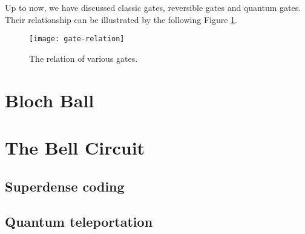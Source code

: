 \documentclass{easyclass}
\begin{document}
Up to now, we have discussed classic gates, reversible gates and quantum gates. Their relationship can be illustrated by the following Figure \ref{fig:gate-relation}.

\begin{figure}[h]
	\centering
	\texttt{[image: gate-relation]}
	\caption{The relation of various gates.}
	\label{fig:gate-relation}
\end{figure}

\section{Bloch Ball}
\section{The Bell Circuit}
\subsection{Superdense coding}
\subsection{Quantum teleportation}




\ifx\flag\undefined
	
\end{document}
